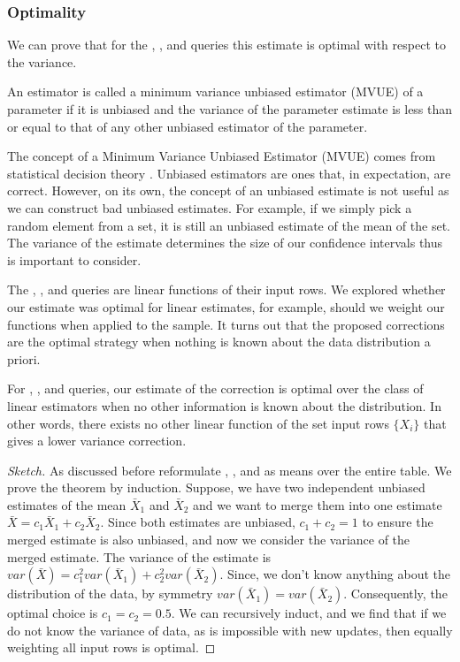 \subsubsection{Optimality}
We can prove that for the \sumfunc, \countfunc, and \avgfunc queries this estimate is optimal with respect to the variance.
\begin{proposition}
An estimator is called a minimum variance unbiased estimator (MVUE) of a parameter if it is unbiased and the variance of the parameter estimate is less than or equal to that of any other unbiased estimator of the parameter.
\end{proposition}
The concept of a Minimum Variance Unbiased Estimator (MVUE) comes from statistical decision theory \cite{cox1979theoretical}.
Unbiased estimators are ones that, in expectation, are correct.
However, on its own, the concept of an unbiased estimate is not useful as we can construct bad unbiased estimates.
For example, if we simply pick a random element from a set, it is still an unbiased estimate of the mean of the set.
The variance of the estimate determines the size of our confidence intervals thus is important to consider.

The \sumfunc, \countfunc, and \avgfunc queries are linear functions of their input rows.
We explored whether our estimate was optimal for linear estimates, for example, should we weight our functions when applied to the sample.
It turns out that the proposed corrections are the optimal strategy when nothing is known about the data distribution a priori.

\begin{theorem}
For \sumfunc, \countfunc, and \avgfunc queries, our estimate of the correction is optimal over the class of linear estimators when no other information is known about the distribution. 
In other words, there exists no other linear function of the set input rows $\{ X_i \}$ that gives a lower variance correction.
\end{theorem}
\begin{proof}[Sketch]
As discussed before reformulate \sumfunc, \countfunc, and \avgfunc as means over the entire table. We prove the theorem by induction. 
Suppose, we have two independent unbiased estimates of the mean $\bar{X}_1$ and $\bar{X}_2$ and we want to merge them into one estimate $\bar{X} = c_1\bar{X}_1+c_2\bar{X}_2$.
Since both estimates are unbiased, $c_1 + c_2 = 1$ to ensure the merged estimate is also unbiased, and now we consider the variance of the merged estimate.
The variance of the estimate is $var(\bar{X}) = c_1^2var(\bar{X}_1) + c_2^2var(\bar{X}_2)$.
Since, we don't know anything about the distribution of the data, by symmetry $var(\bar{X}_1) = var(\bar{X}_2)$.
Consequently, the optimal choice is $c_1=c_2=0.5$. 
We can recursively induct, and we find that if we do not know the variance of data, as is impossible with new updates, then equally weighting all input rows is optimal. 
\end{proof}
